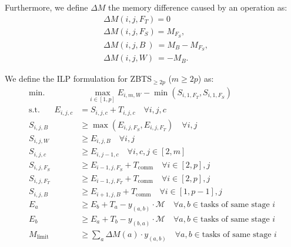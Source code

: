 \documentclass{article}
\begin{document}
Furthermore, we define $\Delta M$ the memory difference caused by an operation as:
\[
\begin{aligned}
&\Delta M(i, j, F_T) = 0 \\
&\Delta M(i, j, F_S) = M_{F_S}, \\
&\Delta M(i, j, B~)~ = M_B - M_{F_S}, \\
&\Delta M(i, j, W) ~= -M_B.
\end{aligned}
\]

We define the ILP formulation for ZBTS$_{\ge 2p}$ ($m\ge2p$) as:
\begin{align}
    \text{min.} & \quad \max_{i \in [1,p]} E_{i,m,W} - \min(S_{i,1,F_T}, S_{i,1,F_S}) \label{eq:objective} \\
    \text{s.t.}~~~~~~~~E_{i,j,c} & = S_{i,j,c} + T_{i,j,c} \quad \forall i, j, c \label{eq:time_relation} \\
    S_{i,j,B} & \geq \max(E_{i,j,F_S}, E_{i,j,F_T}) \quad \forall i, j \label{eq:forward_backward} \\
    S_{i,j,W} & \geq E_{i,j,B} \quad \forall i, j \label{eq:backward_weight} \\
    S_{i,j,c} & \geq E_{i,j-1,c} \quad \forall i, c, j \in [2, m] \label{eq:microbatch_order} \\
    S_{i,j,F_S} & \geq E_{i-1,j,F_S} + T_{\text{comm}} \quad \forall i \in [2, p], j \label{eq:forward_comm_s} \\
    S_{i,j,F_T} & \geq E_{i-1,j,F_T} + T_{\text{comm}} \quad \forall i \in [2, p], j \label{eq:forward_comm_t} \\
    S_{i,j,B} & \geq E_{i+1,j,B} + T_{\text{comm}} \quad \forall i \in [1, p-1], j \label{eq:backward_comm} \\
    E_a & \geq E_b + T_a - y_{(a,b)} \cdot \mathcal{M} \quad \forall a,b \in \text{tasks of same stage } i \label{eq:precedence1} \\
    E_b & \geq E_a + T_b - y_{(b,a)} \cdot \mathcal{M} \quad \forall a,b \in \text{tasks of same stage } i \label{eq:precedence2} \\
    M_{\text{limit}} & \geq \sum_{a} \Delta M(a) \cdot y_{(a,b)} \quad \forall a,b \in \text{tasks of same stage } i \label{eq:memory_constraint}
\end{align}
\end{document}
